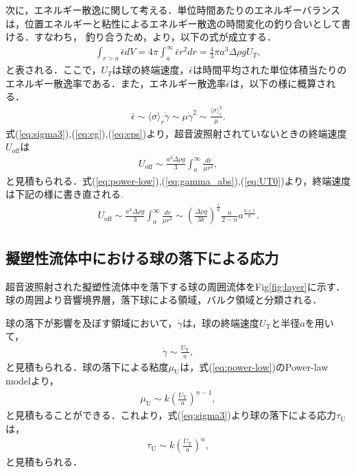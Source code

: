 次に，エネルギー散逸に関して考える．単位時間あたりのエネルギーバランスは，位置エネルギーと粘性によるエネルギー散逸の時間変化の釣り合いとして書ける．すなわち，
釣り合うため，より，以下の式が成立する．
\begin{eqnarray}
    \int_{r>a}\bar{\epsilon}dV = 4 \pi \int^\infty_a \bar{\epsilon}r^2 dr = \frac{4}{3}\pi a^3\Delta\rho g U_T ,
    \label{eq:eg}
\end{eqnarray}
と表される．ここで，$U_T$は球の終端速度，$\bar{\epsilon}$は時間平均された単位体積当たりのエネルギー散逸率である．また，エネルギー散逸率$\bar{\epsilon}$は，以下の様に概算される．
\begin{eqnarray}
    \bar{\epsilon} \sim \langle\sigma\rangle_r\dot{\gamma} \sim \mu \dot{\gamma}^2 \sim \frac{\langle\sigma\rangle_r^2}{\mu} .
    \label{eq:eps}
\end{eqnarray}
式(\ref{eq:sigma3}),(\ref{eq:eg}),(\ref{eq:eps})より，超音波照射されていないときの終端速度$U_\text{off}$は
\begin{eqnarray}
    U_\text{off} \sim \frac{a^3\Delta\rho g}{3}\int_a^\infty\frac{dr}{\mu r^2} ,
    \label{eq:UT0}
\end{eqnarray}
と見積もられる．式(\ref{eq:power-low}),(\ref{eq:gamma_abs}),(\ref{eq:UT0})より，終端速度は下記の様に書き直される.
\begin{eqnarray}
    U_\text{off} \sim \frac{a^3\Delta\rho g}{3}  \int^{\infty}_{a} \frac{dr}{\mu r^2} \sim \left(\frac{\Delta \rho g}{3k}\right)^{\frac{1}{n}}\frac{n}{2-n}a^{\frac{n+1}{n}} .
    \label{eq:UT}
\end{eqnarray}

\subsection{擬塑性流体中における球の落下による応力}
超音波照射された擬塑性流体中を落下する球の周囲流体をFig\ref{fig:layer}に示す．球の周囲より音響境界層，落下球による領域，バルク領域と分類される．

球の落下が影響を及ぼす領域において，$\dot{\gamma}$は，球の終端速度$U_\text{T}$と半径$a$を用いて，
\begin{eqnarray}
    \dot{\gamma} \sim \frac{U_\text{T}}{a},
    \label{eq:UTgamma}
\end{eqnarray}
と見積もられる．球の落下による粘度$\mu_\text{U}$は，式(\ref{eq:power-low})のPower-law modelより，
\begin{eqnarray}
    \mu_\text{U} \sim k \left(\frac{U_\text{T}}{a}\right)^{n-1} ,
    \label{eq:muU}
\end{eqnarray}
と見積もることができる．これより，式(\ref{eq:sigma3})より球の落下による応力$\tau_\text{U}$は，
\begin{eqnarray}
    \tau_\text{U} \sim k \left(\frac{U_\text{T}}{a}\right)^n ,
    \label{eq:tauU}
\end{eqnarray}
と見積もられる．

